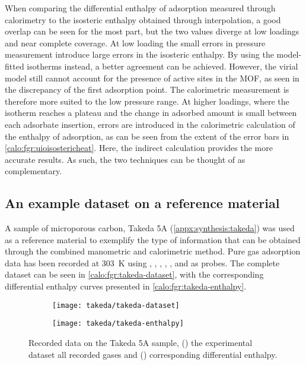 When comparing the differential enthalpy of adsorption measured through
calorimetry to the isosteric enthalpy obtained through interpolation, 
a good overlap can be seen for the most part, but the two values
diverge at low loadings and near complete coverage. 
At low loading the small errors in pressure measurement introduce
large errors in the isosteric enthalpy. By using the model-fitted 
isotherms instead, a better agreement can be achieved. However, the 
virial model still cannot account for the presence of active sites in the 
MOF, as seen in the discrepancy of the first adsorption point.
The calorimetric measurement is therefore more suited to the low pressure
range. At higher loadings, where the isotherm reaches a plateau and
the change in adsorbed amount is small between each adsorbate
insertion, errors are introduced in the calorimetric calculation of
the enthalpy of adsorption, as can be seen from the extent of the error
bars in \autoref{calo:fgr:uioisostericheat}.
Here, the indirect calculation provides the more accurate results.
As such, the two techniques can be thought of as complementary.

\subsection{An example dataset on a reference material}

A sample of microporous carbon, Takeda 5A (\autoref{appx:synthesis:takeda})
was used as a reference material to exemplify the type of information
that can be obtained through the combined manometric and 
calorimetric method. Pure gas adsorption data has been recorded at 
\SI{303}{\kelvin} using , , , , ,
 and  as probes. The complete dataset can be seen 
in \autoref{calo:fgr:takeda-dataset}, with the corresponding differential 
enthalpy curves presented in \autoref{calo:fgr:takeda-enthalpy}.

\begin{figure}[ht]

	\centering
	\begin{subfigure}[b]{.45\textwidth}
		\centering
		\texttt{[image: takeda/takeda-dataset]}
		\caption{}%
		\label{calo:fgr:takeda-dataset}
	\end{subfigure}%
	\quad
	\begin{subfigure}[b]{.45\textwidth}
		\centering
		\texttt{[image: takeda/takeda-enthalpy]}
		\caption{}%
		\label{calo:fgr:takeda-enthalpy}
	\end{subfigure}
	\caption{Recorded data on the Takeda 5A sample, 
		(\protect{}) the
		experimental dataset all recorded gases and 
		(\protect{}) 
		corresponding differential enthalpy.}%
	\label{calo:fgr:takeda-data}

\end{figure}

